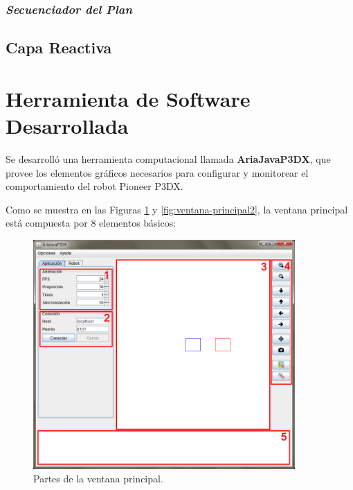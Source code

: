 \documentclass[11pt,twoside,A5]{article}
\begin{document}
\subsubsection*{\textit{Secuenciador del Plan}}

\subsection*{Capa Reactiva}

\pagebreak
\section*{Herramienta de Software Desarrollada}

Se desarrolló una herramienta computacional llamada \textbf{AriaJavaP3DX}, que provee los elementos gráficos necesarios para 
configurar y monitorear el comportamiento del robot Pioneer P3DX.

Como se muestra en las Figuras \ref{fig:ventana-principal-partes} y \ref{fig:ventana-principal2}, la ventana principal está compuesta por 8 elementos básicos:

\begin{figure}[H]
\begin{center}
\includegraphics[width=10cm]{ventana-principal-partes.png} 
\caption{Partes de la ventana principal.}
\label{fig:ventana-principal-partes}
\end{center}
\end{figure}
\end{document}
